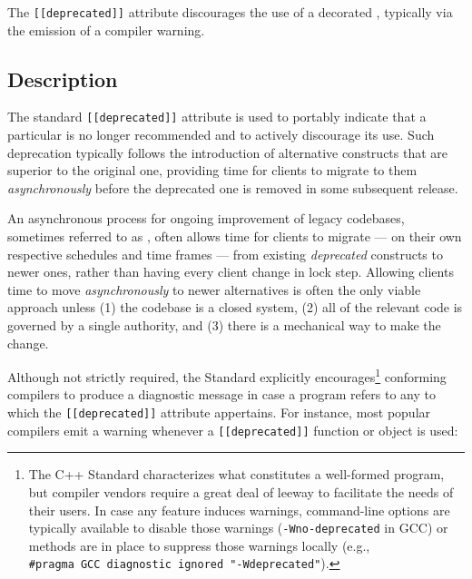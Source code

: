 
\label{deprecated}
\setcounter{table}{0}
\setcounter{footnote}{0}
\setcounter{lstlisting}{0}



The \lstinline![[deprecated]]! attribute discourages the use of a decorated
, typically via the emission of a compiler warning.

\subsection[Description]{Description}\label{description}

The standard \lstinline![[deprecated]]! attribute is used to portably
indicate that a particular  is no longer recommended and
to actively discourage its use. Such deprecation typically follows the
introduction of alternative constructs that are
superior to the original one, providing time for clients to migrate to
them \emph{asynchronously} before the deprecated
one is removed in some subsequent release. 

An asynchronous process for ongoing
improvement of legacy codebases, sometimes referred to as
, often allows time for clients to
migrate --- on their own respective schedules and time frames --- from
existing \emph{deprecated} constructs to newer ones, rather than
having every client change in lock step. Allowing clients time to move
\emph{asynchronously} to newer alternatives is often the only viable
approach unless (1) the codebase is a closed system, (2) all of the
relevant code is governed by a single authority, and (3) there is a mechanical way to make the change.

Although not strictly
required, the Standard explicitly encourages{\cprotect\footnote{The C++
Standard characterizes what constitutes a well-formed program, but
compiler vendors require a great deal of leeway to facilitate the
needs of their users. In case any feature induces warnings,
command-line options are typically available to disable those warnings
(\lstinline!-Wno-deprecated! in GCC) or methods are in place to suppress those warnings
locally (e.g.,
  \lstinline!#pragma!~\lstinline!GCC!~\lstinline!diagnostic!~\lstinline!ignored!~\lstinline!"-Wdeprecated"!).}}
conforming compilers to produce a diagnostic message in case a program
refers to any  to which the \lstinline![[deprecated]]!
attribute appertains. For instance, most popular compilers emit a
warning whenever a \lstinline![[deprecated]]! function or
object is used:

